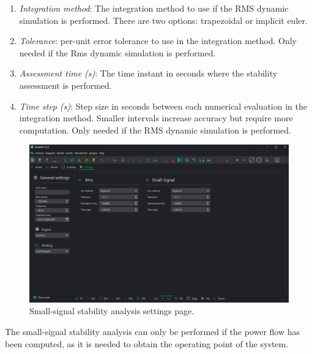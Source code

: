 \begin{enumerate}
  \item \textit{Integration method}: The integration method to use if the RMS dynamic simulation is performed. There are two options: trapezoidal or implicit euler.
  \item \textit{Tolerance}: per-unit error tolerance to use in the integration method. Only needed if the Rms dynamic simulation is performed.
  \item \textit{Assessment time (s)}: The time instant in seconds where the stability assessment is performed.
  \item \textit{Time step (s)}: Step size in seconds between each numerical evaluation in the integration method. 
  Smaller intervals increase accuracy but require more computation. Only needed if the RMS dynamic simulation is performed.
\end{enumerate}


\begin{figure}[H]
  \centering
  \includegraphics[width=0.8\linewidth]{figures/settings_GUI.png}
  \caption{Small-signal stability analysis settings page.}
  \label{fig:smallsignal_settings_GUI}
\end{figure}

The small-signal stability analysis can only be performed if the power flow has been computed,
 as it is needed to obtain the operating point of the system.


